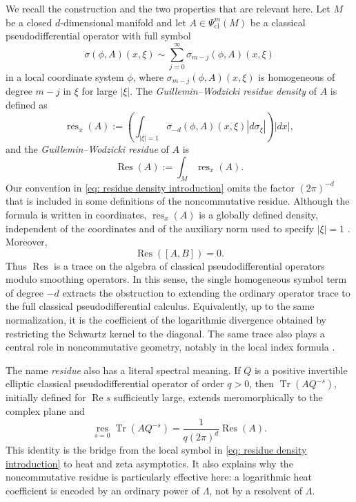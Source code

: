 \documentclass[11pt]{amsart}
\newcommand*{\Res}{\operatorname{Res}}
\newcommand{\Tr}{\operatorname{Tr}}
\renewcommand{\Re}{\operatorname{Re}}
\theoremstyle{definition}
\numberwithin{equation}{section}
\begin{document}
	We recall the construction and the two properties that are relevant here.  Let $M$ be a closed $d$-dimensional manifold and let $A\in\Psi_{\mathrm{cl}}^m(M)$ be a classical pseudodifferential operator with full symbol
	\[
	\sigma(\phi,A)(x,\xi) \sim \sum_{j=0}^\infty \sigma_{m-j}(\phi,A)(x,\xi) 
	\]
	in a local coordinate system $\phi$, where $\sigma_{m-j}(\phi,A)(x,\xi)$ is homogeneous of degree $m-j$ in $\xi$ for large $|\xi|$. The {\em Guillemin--Wodzicki residue density} of $A$ is defined as
	\begin{equation}
		\label{eq: residue density introduction}
		\operatorname{res}_x(A) 	:=  \left(\int_{|\xi|=1} \sigma_{-d}(\phi,A)(x,\xi)|d\sigma_\xi| \right)|dx|,
	\end{equation}
	and the   {\em Guillemin--Wodzicki residue} of $A$ is 
	\begin{equation}
		\Res(A):=\int_M\operatorname{res}_x(A).
	\end{equation}
	Our convention in \eqref{eq: residue density introduction} omits the factor
	$(2\pi)^{-d}$ that is included in some definitions of the noncommutative
	residue.  Although the formula is written in coordinates, $\operatorname{res}_x(A)$
	is a globally defined density, independent of the coordinates and of the
	auxiliary norm used to specify $|\xi|=1$
	\cite{wodzickiNoncommutativeResidueFundamentals1987}. 
	Moreover,
	\[
	\Res([A,B])=0.
	\]
	Thus $\Res$ is a trace on the algebra of classical pseudodifferential operators  modulo smoothing operators. In this sense, the single homogeneous symbol term of degree $-d$ extracts the obstruction to extending the ordinary operator trace to the full classical pseudodifferential calculus.  Equivalently, up to the same normalization, it is the coefficient of the logarithmic divergence obtained by restricting the Schwartz kernel to the diagonal.  The same trace also plays a central role in noncommutative geometry, notably in the local index formula \cite{connesLocalIndexFormula1995}.
	
	
	The name \emph{residue} also has a literal spectral meaning.  If $Q$ is a positive invertible elliptic classical pseudodifferential operator of order $q>0$, then $\Tr(AQ^{-s})$, initially defined for $\Re s$ sufficiently large, extends meromorphically to the complex plane and
	\begin{equation}
		\label{eq: residue-zeta bridge}
		\underset{s=0}{\operatorname{res}} 	\Tr(AQ^{-s})
		= 	\frac{1}{q(2\pi)^d}\Res(A).
	\end{equation}
	This identity is the bridge from the local symbol in \eqref{eq: residue density introduction} to heat and zeta asymptotics.  It also explains why the noncommutative residue is particularly effective here: a logarithmic heat coefficient is encoded by an ordinary power of $\Lambda$, not by a resolvent of $\Lambda$.
	
\end{document}
